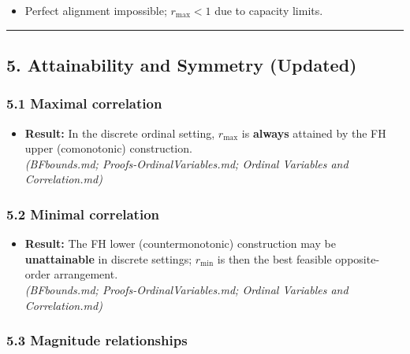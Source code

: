 \documentclass[
  letterpaper,
  DIV=11,
  numbers=noendperiod]{scrartcl}
\providecommand{\tightlist}{%
  \setlength{\itemsep}{0pt}\setlength{\parskip}{0pt}}
\theoremstyle{remark}
\begin{document}
\begin{itemize}
\tightlist
\item
  Perfect alignment impossible; \(r_{\max} < 1\) due to capacity limits.
\end{itemize}

\begin{center}\rule{0.5\linewidth}{0.5pt}\end{center}

\subsection{5. Attainability and Symmetry
(Updated)}\label{attainability-and-symmetry-updated}

\subsubsection{5.1 Maximal correlation}\label{maximal-correlation}

\begin{itemize}
\tightlist
\item
  \textbf{Result:} In the discrete ordinal setting, \(r_{\max}\) is
  \textbf{always} attained by the FH upper (comonotonic) construction.\\
  \emph{(BFbounds.md; Proofs-OrdinalVariables.md; Ordinal Variables and
  Correlation.md)}
\end{itemize}

\subsubsection{5.2 Minimal correlation}\label{minimal-correlation}

\begin{itemize}
\tightlist
\item
  \textbf{Result:} The FH lower (countermonotonic) construction may be
  \textbf{unattainable} in discrete settings; \(r_{\min}\) is then the
  best feasible opposite-order arrangement.\\
  \emph{(BFbounds.md; Proofs-OrdinalVariables.md; Ordinal Variables and
  Correlation.md)}
\end{itemize}

\subsubsection{5.3 Magnitude
relationships}\label{magnitude-relationships}
\end{document}
